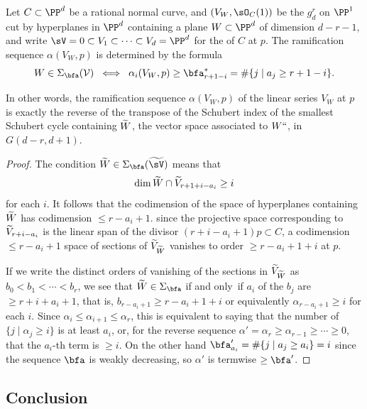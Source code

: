 \begin{proposition}\label{ramification}
Let $C \subset \PP^d$ be a rational normal curve, and $(V_W, \sO_C(1))$
be the $g^r_d$ on $\PP^1$ cut by hyperplanes in $\PP^d$ containing a
plane $W \subset \PP^d$ of dimension $d-r-1$, and write $\sV = 0\subset
V_1\subset \cdots \subset V_d = \PP^d$ for the 
%
of $C$
at $p$. The ramification sequence $\alpha(V_W, p)$
%
is determined by the formula
%
$$
W \in \Sigma_{\bfa}({\cal V}) \; \iff \; \alpha_i(V_W, p) \geq
\bfa^*_{r+1-i} = \#\{j\mid a_j\geq r+1-i\}.
$$
\end{proposition}

In other words, the ramification sequence $\alpha(V_W, p)$ of the linear
series $V_W$ at $p$ is exactly the reverse of the transpose of the
Schubert index of the smallest Schubert cycle containing $\tL$, the vector
space associated to $W` `$, in  $G(d-r, d+1)$.

\begin{proof}

The condition $\tL \in \Sigma_{\bfa}({\tsV})$
 means that
$$
\dim \tL \cap \tV_{r+1+i-a_i} \geq i
$$
for each $i$.
It follows that the codimension of the space of hyperplanes containing
$\tL$ has codimension $\leq r-a_i+1$.
since the projective space corresponding to $\tV_{r+i-a_i}$ is the linear
span of the divisor $(r+i-a_i+1)p\subset C$,
a codimension $\leq r-a_i+1$ space of sections of $\tV_{\tL}$  vanishes
to order $\geq r -a_i+1+i$ at $p$.

If we write the distinct orders of vanishing of the sections in
$\tV_{\tL}$ as
$b_0 < b_1<  \cdots < b_r$, we see that $\tL \in \Sigma_{\bfa}$  if
and only~if
$a_i$ of the $b_j$ are $\geq r+i+a_i+1$, that is,
$b_{r-a_i+1}\geq r-a_i+1+i$ or equivalently $\alpha_{r-a_i+1}\geq i$
for each $i$.
Since $\alpha_i\leq \alpha_{i+1} \leq \alpha_r$,
this is equivalent to saying that the number of $\{j \mid \alpha_j \geq
i\}$ is at least $a_i$, or, for the
reverse sequence $\alpha' = \alpha_r \geq \alpha_{r-1} \geq \cdots \geq
0$, that the $a_i$-th term is $\geq i$.
On the other hand $\bfa'_{a_i} = \#\{j\mid a_j \geq a_i\} = i$ since
the sequence $\bfa$ is weakly
decreasing, so $\alpha'$ is termwise $\geq \bfa'$.
\end{proof}

\subsection*{Conclusion}

